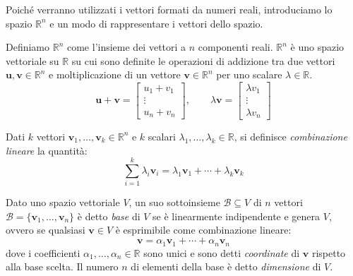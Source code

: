 Poiché verranno utilizzati i vettori formati da numeri reali, introduciamo lo spazio $\mathbb{R}^n$ e un modo di rappresentare i vettori dello spazio.

\begin{definizione}[$\mathbb{R}^n$]
    Definiamo $\mathbb{R}^n$ come l'insieme dei vettori a $n$ componenti reali.
    $\mathbb{R}^n$ è uno spazio vettoriale su $\mathbb{R}$ su cui sono definite le operazioni di addizione tra due vettori $\mathbf{u}, \mathbf{v} \in \mathbb{R}^n$ e moltiplicazione di un vettore $\mathbf{v} \in \mathbb{R}^n$ per uno scalare $\lambda \in \mathbb{R}$.
    \[
        \mathbf{u} + \mathbf{v} =
        \begin{bmatrix} u_1 + v_1 \\ \vdots \\ u_n + v_n \end{bmatrix},
        \qquad
        \lambda\mathbf{v} =
        \begin{bmatrix} \lambda v_1 \\ \vdots \\ \lambda v_n \end{bmatrix}
    \]
\end{definizione}

\begin{definizione}
    Dati $k$ vettori $\mathbf{v}_1, \ldots, \mathbf{v}_k \in \mathbb{R}^n$ e $k$ scalari $\lambda_1, \ldots, \lambda_k \in \mathbb{R}$, si definisce \emph{combinazione lineare} la quantità:
    \[
        \sum_{i=1}^{k} \lambda_i \mathbf{v}_i = \lambda_1 \mathbf{v}_1 + \cdots + \lambda_k \mathbf{v}_k
    \]
\end{definizione}

\begin{definizione}[Base]
    Dato uno spazio vettoriale $V$, un suo sottoinsieme $\mathcal{B} \subseteq V$ di $n$ vettori $\mathcal{B} = \{\mathbf{v}_1, \dots, \mathbf{v}_n\}$ è detto \emph{base} di $V$ se è linearmente indipendente e genera $V$, ovvero se qualsiasi $\mathbf{v} \in V$ è esprimibile come combinazione lineare:
    \[
        \mathbf{v} = \alpha_1 \mathbf{v}_1 + \cdots + \alpha_n \mathbf{v}_n
    \]
    dove i coefficienti $\alpha_1, \dots, \alpha_n \in \mathbb{R}$ sono unici e sono detti \emph{coordinate} di $\mathbf{v}$ rispetto alla base scelta.
    Il numero $n$ di elementi della base è detto \emph{dimensione} di $V$.
\end{definizione}

